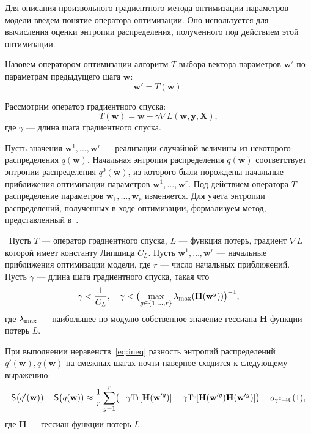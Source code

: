 \documentclass[12pt]{a&t}
\begin{document}

Для описания произвольного градиентного метода оптимизации параметров модели введем понятие оператора оптимизации. Оно используется для вычисления оценки энтропии распределения, полученного под действием этой оптимизации.

\begin{definition} Назовем оператором оптимизации алгоритм $T$ выбора вектора параметров $\mathbf{w}'$  по параметрам предыдущего шага $\mathbf{w}$:
\[
	\mathbf{w}' = T(\mathbf{w}).
\]
\end{definition}

Рассмотрим оператор градиентного спуска:
\begin{equation}
\label{eq:sgd}
	T(\mathbf{w}) = \mathbf{w} - \gamma \nabla L(\mathbf{w}, \mathbf{y}, \mathbf{X}), 
\end{equation}
где  $\gamma$ --- длина шага градиентного спуска.

Пусть значения $\mathbf{w}^1, \dots, \mathbf{w}^r$  --- реализации случайной величины из некоторого распределения $q(\mathbf{w})$. Начальная энтропия распределения $q(\mathbf{w})$ соответствует энтропии распределения $q^0(\mathbf{w})$, из которого были порождены начальные приближения оптимизации параметров $\mathbf{w}^1, \dots, \mathbf{w}^r$. Под действием оператора $T$ распределение параметров $\mathbf{w}_1, \dots, \mathbf{w}_r$ изменяется. Для учета энтропии распределений, полученных в ходе оптимизации,
{ формализуем метод,  представленный в~\cite{early}. }

\begin{theorem_empty}~Пусть $T$ --- оператор градиентного спуска,
 $L$ --- функция потерь, градиент $\nabla L$ которой имеет константу Липшица $C_L$.  Пусть $\mathbf{w}^1,\dots,\mathbf{w}^r$ ---  начальные приближения оптимизации модели, где $r$ --- число начальных приближений. Пусть $\gamma$ --- длина шага градиентного спуска, такая что
\begin{equation}
\label{eq:ineq}
\gamma<\frac{1}{C_L}, \quad \gamma < \bigl(\max_{g \in \{1,\dots,r\}}\lambda_\textnormal{max} (\mathbf{H}(\mathbf{w}^g))\bigr)^{-1}, 
\end{equation}
где $\lambda_\textnormal{max}$ --- наибольшее по модулю собственное значение гессиана  $\mathbf{H}$ функции потерь $L$.

При выполнении неравенств~\eqref{eq:ineq} разность энтропий распределений $q'(\mathbf{w}), q(\mathbf{w})$ на смежных шагах почти наверное сходится к следующему выражению: 
\begin{equation}
\label{eq:entropy}
	\mathsf{S}\bigl(q'(\mathbf{w})) -  \mathsf{S}\bigl(q(\mathbf{w}))  \approx  \frac{1}{r}\sum_{g=1}^r \bigl(-\gamma \textnormal{Tr}[\mathbf{H}(\mathbf{w}'^g)] - \gamma \textnormal{Tr}[\mathbf{H}(\mathbf{w}'^g)\mathbf{H}(\mathbf{w}'^g)]  \bigr) + o_{\gamma^2 \to 0}(1),
\end{equation}
где $\mathbf{H}$ --- гессиан функции потерь $L$.
\end{theorem_empty}
\end{document}
